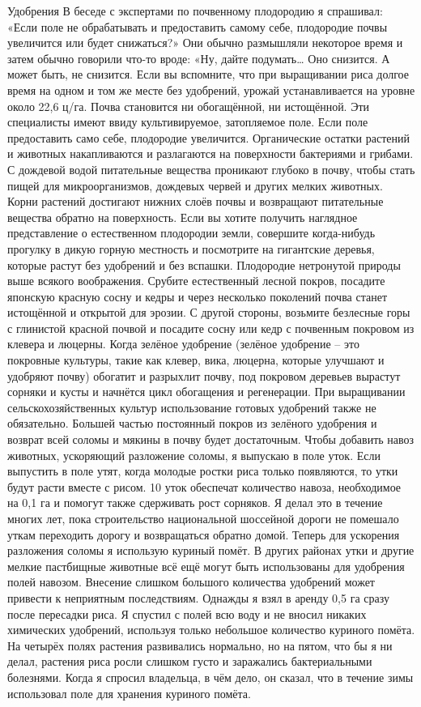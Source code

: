 \documentclass[a4paper]{book}
\begin{document}
Удобрения
В беседе с экспертами по почвенному плодородию я спрашивал: «Если поле не
обрабатывать и предоставить самому себе, плодородие почвы увеличится или будет
снижаться?» Они обычно размышляли некоторое время и затем обычно говорили что-то
вроде: «Ну, дайте подумать… Оно снизится. А может быть, не снизится. Если вы вспомните,
что при выращивании риса долгое время на одном и том же месте без удобрений, урожай
устанавливается на уровне около 22,6 ц/га. Почва становится ни обогащённой, ни
истощённой.
Эти специалисты имеют ввиду культивируемое, затопляемое поле. Если поле
предоставить само себе, плодородие увеличится. Органические остатки растений и
животных накапливаются и разлагаются на поверхности бактериями и грибами. С дождевой
водой питательные вещества проникают глубоко в почву, чтобы стать пищей для
микроорганизмов, дождевых червей и других мелких животных. Корни растений достигают
нижних слоёв почвы и возвращают питательные вещества обратно на поверхность.
Если вы хотите получить наглядное представление о естественном плодородии земли,
совершите когда-нибудь прогулку в дикую горную местность и посмотрите на гигантские
деревья, которые растут без удобрений и без вспашки. Плодородие нетронутой природы выше
всякого воображения.
Срубите естественный лесной покров, посадите японскую красную сосну и кедры и
через несколько поколений почва станет истощённой и открытой для эрозии. С другой
стороны, возьмите безлесные горы с глинистой красной почвой и посадите сосну или кедр с
почвенным покровом из клевера и люцерны. Когда зелёное удобрение (зелёное удобрение –
это покровные культуры, такие как клевер, вика, люцерна, которые улучшают и удобряют
почву) обогатит и разрыхлит почву, под покровом деревьев вырастут сорняки и кусты и
начнётся цикл обогащения и регенерации.
При выращивании сельскохозяйственных культур использование готовых удобрений
также не обязательно. Большей частью постоянный покров из зелёного удобрения и возврат
всей соломы и мякины в почву будет достаточным. Чтобы добавить навоз животных,
ускоряющий разложение соломы, я выпускаю в поле уток. Если выпустить в поле утят, когда
молодые ростки риса только появляются, то утки будут расти вместе с рисом. 10 уток
обеспечат количество навоза, необходимое на 0,1 га и помогут также сдерживать рост
сорняков.
Я делал это в течение многих лет, пока строительство национальной шоссейной дороги
не помешало уткам переходить дорогу и возвращаться обратно домой. Теперь для ускорения
разложения соломы я использую куриный помёт. В других районах утки и другие мелкие
пастбищные животные всё ещё могут быть использованы для удобрения полей навозом.
Внесение слишком большого количества удобрений может привести к неприятным
последствиям. Однажды я взял в аренду 0,5 га сразу после пересадки риса. Я спустил с
полей всю воду и не вносил никаких химических удобрений, используя только небольшое
количество куриного помёта. На четырёх полях растения развивались нормально, но на
пятом, что бы я ни делал, растения риса росли слишком густо и заражались бактериальными
болезнями. Когда я спросил владельца, в чём дело, он сказал, что в течение зимы
использовал поле для хранения куриного помёта.
\end{document}
